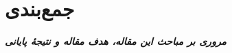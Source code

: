 \chapter{جمع‌بندی}
\noindent
\textbf{
	\textit{
      مروری بر مباحث این مقاله، هدف مقاله و نتیجهٔ پایانی
	}
}
\pagebreak